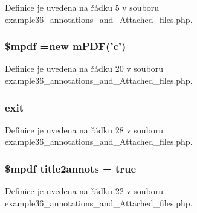 Definice je uvedena na řádku 5 v souboru example36\-\_\-annotations\-\_\-and\-\_\-\-Attached\-\_\-files.\-php.

\hypertarget{example36__annotations__and___attached__files_8php_ad028f81910d6cbab9b184d2214b3a8f8}{
\subsubsection[{\$mpdf}]{\setlength{\rightskip}{0pt plus 5cm}\$mpdf =new {\bf m\-P\-D\-F}('c')}}\label{example36__annotations__and___attached__files_8php_ad028f81910d6cbab9b184d2214b3a8f8}


Definice je uvedena na řádku 20 v souboru example36\-\_\-annotations\-\_\-and\-\_\-\-Attached\-\_\-files.\-php.

\hypertarget{example36__annotations__and___attached__files_8php_a6733eb5f605d09eaede9845835d71c4e}{
\subsubsection[{exit}]{\setlength{\rightskip}{0pt plus 5cm}exit}}\label{example36__annotations__and___attached__files_8php_a6733eb5f605d09eaede9845835d71c4e}


Definice je uvedena na řádku 28 v souboru example36\-\_\-annotations\-\_\-and\-\_\-\-Attached\-\_\-files.\-php.

\hypertarget{example36__annotations__and___attached__files_8php_a6858b83300e964b6c235331d75451e50}{
\subsubsection[{title2annots}]{\setlength{\rightskip}{0pt plus 5cm}\$mpdf title2annots = true}}\label{example36__annotations__and___attached__files_8php_a6858b83300e964b6c235331d75451e50}


Definice je uvedena na řádku 22 v souboru example36\-\_\-annotations\-\_\-and\-\_\-\-Attached\-\_\-files.\-php.

